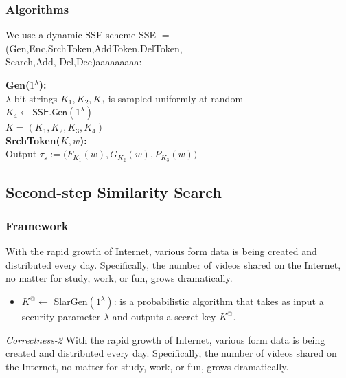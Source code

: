 \documentclass[a4paper,12pt,UTF8]{ctexart}
\begin{document}
\begin{spacing}{1.1}
\subsubsection{Algorithms}
We use a dynamic SSE scheme \textsf{SSE} $=$ (\textsf{Gen,Enc,SrchToken,AddToken,DelToken,
\\Search,Add, Del,Dec})aaaaaaaaa: 	
\begin{framed}
\noindent\textbf{\textsf{Gen}($1^\lambda$):}
\\\indent $\lambda$-bit strings $K_1,K_2,K_3$ is sampled uniformly at random
\\\indent $K_4\leftarrow\textsf{SSE.Gen}(1^\lambda)$
\\\indent $K=(K_1,K_2,K_3,K_4)$
\vspace{2.2mm}\\
\noindent\textbf{\textsf{SrchToken}($K,w$):}
\\\indent Output $\tau_s:=\big(F_{K_1}(w),G_{K_2}(w),P_{K_3}(w)\big)$
\end{framed}
\subsection{Second-step Similarity Search}
\subsubsection{Framework}
With the rapid growth of Internet, various form data is being created and distributed every day. Specifically, the number of videos shared on the Internet, no matter for study, work, or fun, grows dramatically. 
\begin{itemize}
	\setlength{\itemsep}{0mm} %
	\setlength{\parskip}{0mm} %
	\setlength{\parsep}{0pt} %
	\item $K^@\leftarrow$ \textsf{SlarGen}$(1^\lambda)$: is a probabilistic algorithm that takes as input a security parameter $\lambda$ and outputs a secret key $K^@$. 	
\end{itemize}
\indent\indent\emph{Correctness-2} With the rapid growth of Internet, various form data is being created and distributed every day. Specifically, the number of videos shared on the Internet, no matter for study, work, or fun, grows dramatically. 


\end{spacing}
\end{document}
